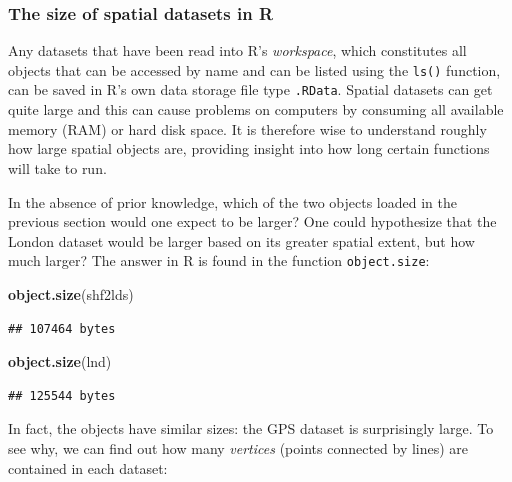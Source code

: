\documentclass[]{article}
\newenvironment{Shaded}{}{}
\newcommand{\KeywordTok}[1]{\textcolor[rgb]{0.00,0.44,0.13}{\textbf{{#1}}}}
\newcommand{\NormalTok}[1]{{#1}}
\begin{document}
\subsubsection{The size of spatial datasets in R}

Any datasets that have been read into R's \emph{workspace}, which
constitutes all objects that can be accessed by name and can be listed
using the \texttt{ls()} function, can be saved in R's own data storage
file type \texttt{.RData}. Spatial datasets can get quite large and this
can cause problems on computers by consuming all available memory (RAM)
or hard disk space. It is therefore wise to understand roughly how large
spatial objects are, providing insight into how long certain functions
will take to run.

In the absence of prior knowledge, which of the two objects loaded in
the previous section would one expect to be larger? One could
hypothesize that the London dataset would be larger based on its greater
spatial extent, but how much larger? The answer in R is found in the
function \texttt{object.size}:

\begin{Shaded}
\begin{Highlighting}[]
\KeywordTok{object.size}\NormalTok{(shf2lds)}
\end{Highlighting}
\end{Shaded}
\begin{verbatim}
## 107464 bytes
\end{verbatim}
\begin{Shaded}
\begin{Highlighting}[]
\KeywordTok{object.size}\NormalTok{(lnd)}
\end{Highlighting}
\end{Shaded}
\begin{verbatim}
## 125544 bytes
\end{verbatim}
In fact, the objects have similar sizes: the GPS dataset is surprisingly
large. To see why, we can find out how many \emph{vertices} (points
connected by lines) are contained in each dataset:
\end{document}
